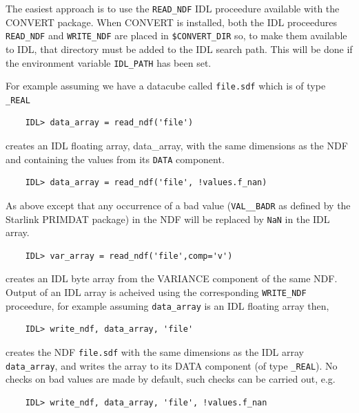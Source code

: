 \documentclass[twoside,11pt]{article}
\newcommand{\xref}[3]{#1}
\begin{document}
The easiest approach is to use the \xref{{\tt READ\_NDF}}{sun55}{READ_NDF} IDL proceedure available with the \xref{CONVERT}{sun55}{} package. When CONVERT is installed, both the IDL proceedures {\tt READ\_NDF} and {\tt WRITE\_NDF} are placed in {\tt \$CONVERT\_DIR} so, to make them available to IDL, that directory must be added to the IDL search path. This will be done if the environment variable {\tt IDL\_PATH} has been set.

For example assuming we have a datacube called {\tt file.sdf} which is of type {\tt \_REAL}

\small\begin{verbatim}
    IDL> data_array = read_ndf('file') 
\end{verbatim}\normalsize

creates an IDL floating array, data\_array, with the same dimensions as the NDF and containing the values from its {\tt DATA} component. 

\small\begin{verbatim}
    IDL> data_array = read_ndf('file', !values.f_nan) 
\end{verbatim}\normalsize

As above except that any occurrence of a bad value ({\tt VAL\_\_BADR} as defined by the Starlink \xref{PRIMDAT}{sun39}{} package) in the NDF will be replaced by {\tt NaN} in the IDL array. 

\small\begin{verbatim}
    IDL> var_array = read_ndf('file',comp='v') 
\end{verbatim}\normalsize

creates an IDL byte array from the VARIANCE component of the same NDF. Output of an IDL array is acheived using the corresponding \xref{{\tt WRITE\_NDF}}{sun55}{WRITE_NDF} proceedure, for example assuming {\tt data\_array} is an IDL floating array then, 

\small\begin{verbatim}
    IDL> write_ndf, data_array, 'file' 
\end{verbatim}\normalsize

creates the NDF {\tt file.sdf} with the same dimensions as the IDL array {\tt data\_array}, and writes the array to its DATA component (of type {\tt \_REAL}). No checks on bad values are made by default, such checks can be carried out, e.g.\

\small\begin{verbatim}
    IDL> write_ndf, data_array, 'file', !values.f_nan 
\end{verbatim}\normalsize  
\end{document}
